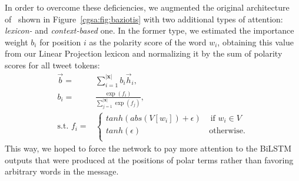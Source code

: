 In order to overcome these deficiencies, we augmented the original
architecture of~\citet{Baziotis:17} shown in
Figure~\ref{cgsa:fig:baziotis} with two additional types of attention:
\emph{lexicon-} and \emph{context-based} one.  In the former type, we
estimated the importance weight $b_i$ for position $i$ as the polarity
score of the word $w_i$, obtaining this value from our Linear
Projection lexicon and normalizing it by the sum of polarity scores
for all tweet tokens:
\begin{align*}
  \vec{b} =& \sum_{i=1}^{|\mathbf{x}|}b_i\vec{h}_i,\\
  b_i =& \frac{\exp(f_i)}{\sum_{j=1}^{|\mathbf{x}|}\exp(f_j)},\\
  \mbox{s.t. }f_i
  =& \left\{
  \begin{array}{ll}
    tanh(abs(V[{w_i}]) + \epsilon) & \textrm{ if } w_i\in V\\
    tanh(\epsilon) & \, \textrm{otherwise.} \\
  \end{array}
  \right .
\end{align*}\label{cgsa:eq:lba}%
This way, we hoped to force the network to pay more attention to the
BiLSTM outputs that were produced at the positions of polar terms
rather than favoring arbitrary words in the message.

